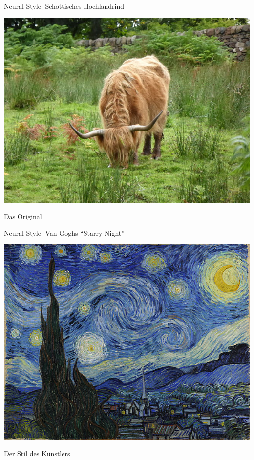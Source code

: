 \begin{frame}{Neural Style: Schottisches Hochlandrind}
    \begin{center}
        \includegraphics[width=\textwidth, height=0.8\textheight, keepaspectratio]{../figures/Artistic-Style/highland-cattle.jpg}

        Das Original
    \end{center}
\end{frame}

\begin{frame}{Neural Style: Van Goghs \enquote{Starry Night}}
    \begin{center}
        \includegraphics[width=\textwidth, height=0.8\textheight, keepaspectratio]{../figures/Artistic-Style/starry-night.jpg}

    Der Stil des Künstlers
    \end{center}
\end{frame}

